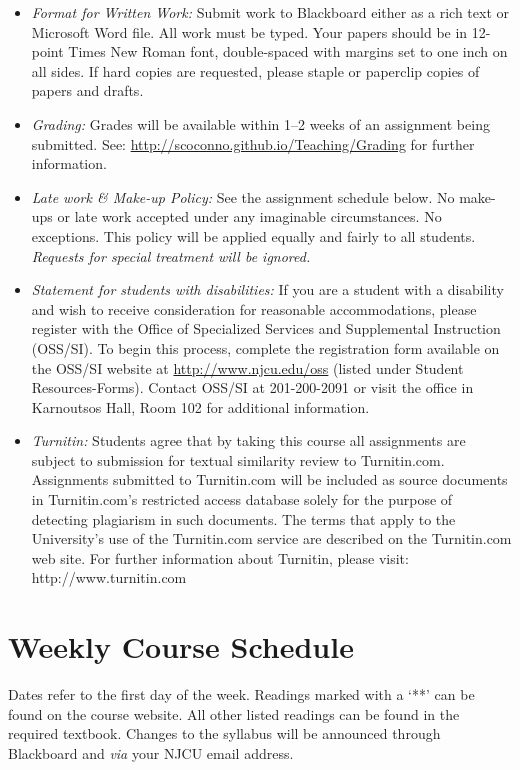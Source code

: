 \documentclass[article,oneside]{memoir}
\begin{document}
\begin{itemize}
\item \textit{Format for Written Work:} Submit work to Blackboard either as a rich text or Microsoft Word file. All work must be typed. Your papers should be in 12-point Times New Roman font, double-spaced with margins set to one inch on all sides. If hard copies are requested, please staple or paperclip copies of papers and drafts.




\item \textit{Grading:} Grades will be available within 1--2 weeks of an assignment being submitted. See: \href{http://scoconno.github.io/Teaching/Grading}{http://scoconno.github.io/Teaching/Grading} for further information.


\item \textit{Late work \& Make-up Policy:} See the assignment schedule below. No make-ups or late work accepted under any imaginable circumstances. No exceptions. This policy will be applied equally and fairly to all students. \emph{Requests for special treatment will be ignored.}

\item \textit{Statement for students with disabilities:} If you are a student
with a disability and wish to receive consideration for reasonable
accommodations, please register with the Office of Specialized Services
and Supplemental Instruction (OSS/SI). To begin this process, complete
the registration form available on the OSS/SI website at
\href{http://www.njcu.edu/oss}{http://www.njcu.edu/oss}
(listed under Student Resources-Forms). Contact OSS/SI at 201-200-2091
or visit the office in Karnoutsos Hall, Room 102 for additional
information.

\item \textit{Turnitin:} Students agree that by taking this course all assignments are subject to submission for textual similarity review to Turnitin.com. Assignments submitted to Turnitin.com will be included as source documents in Turnitin.com's restricted access database solely for the purpose of detecting plagiarism in such documents.  The terms that apply to the University’s use of the Turnitin.com service are described on the Turnitin.com web site.  For further information about Turnitin, please visit: http://www.turnitin.com 


\end{itemize}



\section{Weekly Course Schedule}
Dates refer to the first day of the week. Readings marked with a `**' can be found on the course website. All other listed readings can be found in the required textbook. Changes to the syllabus will be announced through Blackboard and \emph{via} your NJCU email address.\\
\end{document}
